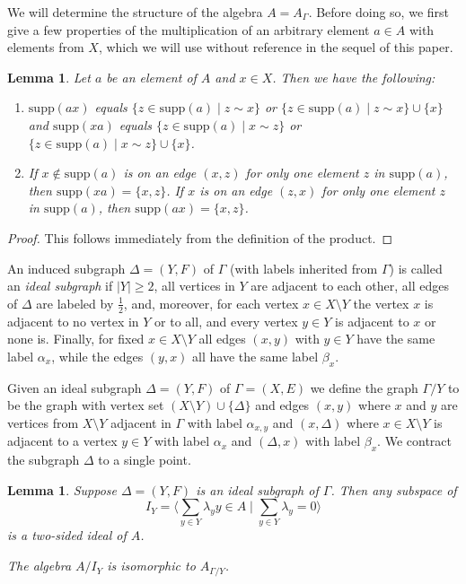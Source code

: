 \documentclass[oneside,a4paper]{amsart} %
\newtheorem{lemma}[proposition]{Lemma}
\theoremstyle{definition}
\begin{document}
We will determine the structure of the algebra $A=A_\Gamma$.
Before doing so, we first give a few properties of the multiplication of an arbitrary element $a\in A$ with elements from $X$,
which we will use without reference in the sequel of this paper.


\begin{lemma}
Let $a$ be an element of $A$ and $x\in X$.
Then we have the following:
\begin{enumerate}
\item   $\mathrm{supp}(ax)$  equals $\{z\in \mathrm{supp}(a)\mid z\sim x\}$
or $\{z\in \mathrm{supp}(a)\mid z\sim x\}\cup \{x\}$
and $\mathrm{supp}(xa)$  equals $\{z\in \mathrm{supp}(a)\mid x\sim z\}$
or $\{z\in \mathrm{supp}(a)\mid x\sim z\}\cup \{x\}$.

\item If $x\not \in \mathrm{supp}(a)$ is on  an edge $(x,z)$ for only one element $z$ in  $\mathrm{supp}(a)$, then $\mathrm{supp}(xa)=\{x,z\}$.
If $x$ is on an edge $(z,x)$ for only one element $z$ in  $\mathrm{supp}(a)$, then $\mathrm{supp}(ax)=\{x,z\}$.
\end{enumerate}
\end{lemma}


\begin{proof}
This follows immediately from the definition of the product.
\end{proof}


An induced subgraph $\Delta=(Y,F)$ of $\Gamma$ (with labels inherited from $\Gamma$) is called an \emph{ideal subgraph}
if $|Y|\geq 2$,  all vertices in $Y$ are adjacent to each other,   all edges of $\Delta$ are labeled by $\frac{1}{2}$, and, moreover, for each vertex $x \in X\setminus Y$ the vertex $x$
is adjacent to no vertex in $Y$ or to all, and every vertex $y\in Y$ is adjacent to $x$ or none is.
Finally, for fixed $x\in X\setminus Y$ all  edges
$(x,y)$  with $y\in Y$  have the same label $\alpha_x$, while the edges $(y,x)$ all have the same label $\beta_x$.

Given an ideal subgraph $\Delta=(Y,F)$ of $\Gamma=(X,E)$ we define the graph $\Gamma/Y$ 
to be the graph with vertex set $(X\setminus Y)\cup \{\Delta\}$ and edges $(x,y)$ where $x$ and $y$ are vertices from $X\setminus Y$ adjacent in $\Gamma$ with label $\alpha_{x,y}$ and
$(x,\Delta)$ where $x\in X\setminus Y$ is adjacent  to a vertex $y\in Y$ with label $\alpha_{x}$
and  $(\Delta,x)$ with label $\beta_{x}$.
We contract the subgraph $\Delta$ to a single point.

\begin{lemma}\label{idealgraph}
Suppose  $\Delta=(Y,F)$ is an ideal subgraph of $\Gamma$. Then any subspace of $$I_Y=\langle\displaystyle\sum_{y\in Y} \lambda_y y\in A\mid\displaystyle\sum_{y\in Y} \lambda_y=0 \rangle$$
is a two-sided ideal of $A$.

The algebra $A/I_Y$ is isomorphic to $A_{\Gamma/Y}$. 
\end{lemma}
\end{document}
